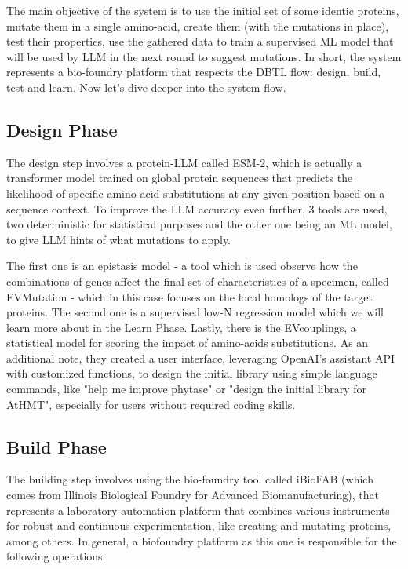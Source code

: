\documentclass[10pt,a4paper]{article}
\begin{document}
	The main objective of the system is to use the initial set of some identic proteins, mutate them in a single amino-acid, create them (with the mutations in place), test their properties, use the gathered data to train a supervised ML model that will be used by LLM in the next round to suggest mutations. In short, the system represents a bio-foundry platform that respects the DBTL flow: design, build, test and learn. Now let's dive deeper into the system flow.
	
	\subsection{Design Phase}
	
	The design step involves a protein-LLM called ESM-2, which is actually a transformer model trained on global protein sequences that predicts the likelihood of specific amino acid substitutions at any given position based on a sequence context. To improve the LLM accuracy even further, 3 tools are used, two deterministic for statistical purposes and the other one being an ML model, to give LLM hints of what mutations to apply.
	
	The first one is an epistasis model - a tool which is used observe how the combinations of genes affect the final set of characteristics of a specimen, called EVMutation - which in this case focuses on the local homologs of the target proteins. The second one is a supervised low-N regression model which we will learn more about in the Learn Phase. Lastly, there is the EVcouplings, a statistical model for scoring the impact of amino-acids substitutions. As an additional note, they created a user interface, leveraging OpenAI's assistant API with customized functions, to design the initial library using simple language commands, like "help me improve phytase" or "design the initial library for AtHMT", especially for users without required coding skills.
	
	\subsection{Build Phase}
	
	The building step involves using the bio-foundry tool called iBioFAB (which comes from Illinois Biological Foundry for Advanced Biomanufacturing), that represents a laboratory automation platform that combines various instruments for robust and continuous experimentation, like creating and mutating proteins, among others. In general, a biofoundry platform as this one is responsible for the following operations:
	
\end{document}

